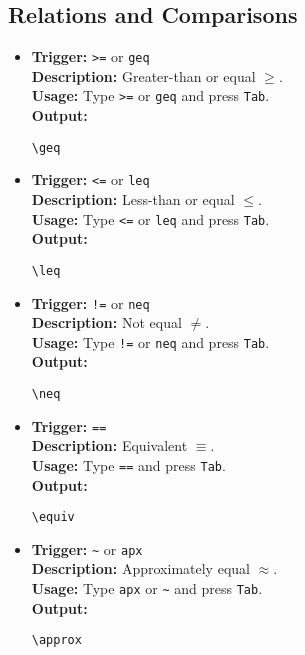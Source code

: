 \documentclass{article}
\begin{document}
\subsection{Relations and Comparisons}
\begin{itemize}[leftmargin=*, label={}]
\item \textbf{Trigger:} \texttt{>=} or \texttt{geq} \\
\textbf{Description:} Greater-than or equal \(\geq\). \\
\textbf{Usage:} Type \texttt{>=} or \texttt{geq} and press \texttt{Tab}. \\
\textbf{Output:}
\begin{verbatim}
\geq 
\end{verbatim}

\item \textbf{Trigger:} \texttt{<=} or \texttt{leq} \\
\textbf{Description:} Less-than or equal \(\leq\). \\
\textbf{Usage:} Type \texttt{<=} or \texttt{leq} and press \texttt{Tab}. \\
\textbf{Output:}
\begin{verbatim}
\leq 
\end{verbatim}

\item \textbf{Trigger:} \texttt{!=} or \texttt{neq} \\
\textbf{Description:} Not equal \(\neq\). \\
\textbf{Usage:} Type \texttt{!=} or \texttt{neq} and press \texttt{Tab}. \\
\textbf{Output:}
\begin{verbatim}
\neq 
\end{verbatim}

\item \textbf{Trigger:} \texttt{==} \\
\textbf{Description:} Equivalent \(\equiv\). \\
\textbf{Usage:} Type \texttt{==} and press \texttt{Tab}. \\
\textbf{Output:}
\begin{verbatim}
\equiv 
\end{verbatim}

\item \textbf{Trigger:} \texttt{\~} or \texttt{apx} \\
\textbf{Description:} Approximately equal \(\approx\). \\
\textbf{Usage:} Type \texttt{apx} or \texttt{\~} and press \texttt{Tab}. \\
\textbf{Output:}
\begin{verbatim}
\approx 
\end{verbatim}


\end{itemize}
\end{document}
